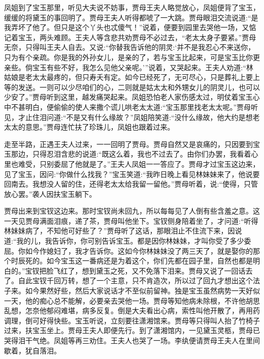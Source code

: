 \begin{parag}
    凤姐到了宝玉那里，听见大夫说不妨事，贾母王夫人略觉放心，凤姐便背了宝玉，缓缓的将黛玉的事回明了。贾母王夫人听得都唬了一大跳。贾母眼泪交流说道:“是我弄坏了他了。但只是这个丫头也忒傻气！”说着，便要到园里去哭他一场，又惦记着宝玉，两头难顾。王夫人等含悲共劝贾母不必过去，“老太太身子要紧。”贾母无奈，只得叫王夫人自去。又说:“你替我告诉他的阴灵:‘并不是我忍心不来送你，只为有个亲疏。你是我的外孙女儿，是亲的了，若与宝玉比起来，可是宝玉比你更亲些。倘宝玉有些不好，我怎么见他父亲呢。’”说着，又哭起来。王夫人劝道:“林姑娘是老太太最疼的，但只寿夭有定。如今已经死了，无可尽心，只是葬礼上要上等的发送。一则可以少尽咱们的心，二则就是姑太太和外甥女儿的阴灵儿，也可以少安了。”贾母听到这里，越发痛哭起来。凤姐恐怕老人家伤感太过，明仗着宝玉心中不甚明白，便偷偷的使人来撒个谎儿哄老太太道:“宝玉那里找老太太呢。”贾母听见，才止住泪问道:“不是又有什么缘故？”凤姐陪笑道:“没什么缘故，他大约是想老太太的意思。”贾母连忙扶了珍珠儿，凤姐也跟着过来。
\end{parag}


\begin{parag}
    走至半路，正遇王夫人过来，一一回明了贾母。贾母自然又是哀痛的，只因要到宝玉那边，只得忍泪含悲的说道:“既这么着，我也不过去了。由你们办罢，我看着心里也难受，只别委屈了他就是了。”王夫人凤姐一一答应了。贾母才过宝玉这边来，见了宝玉，因问:“你做什么找我？”宝玉笑道:“我昨日晚上看见林妹妹来了，他说要回南去。我想没人留的住，还得老太太给我留一留他。”贾母听着，说:“使得，只管放心罢。”袭人因扶宝玉躺下。
\end{parag}


\begin{parag}
    贾母出来到宝钗这边来。那时宝钗尚未回九，所以每每见了人倒有些含羞之意。这一天见贾母满面泪痕，递了茶，贾母叫他坐下。宝钗侧身陪着坐了，才问道:“听得林妹妹病了，不知他可好些了？”贾母听了这话，那眼泪止不住流下来，因说道:“我的儿，我告诉你，你可别告诉宝玉。都是因你林妹妹，才叫你受了多少委屈。你如今作媳妇了，我才告诉你。这如今你林妹妹没了两三天了，就是娶你的那个时辰死的。如今宝玉这一番病还是为着这个，你们先都在园子里，自然也都是明白的。”宝钗把脸飞红了，想到黛玉之死，又不免落下泪来。贾母又说了一回话去了。自此宝钗千回万转，想了一个主意，只不肯造次，所以过了回九才想出这个法子来。如今果然好些，然后大家说话才不至似前留神。独是宝玉虽然病势一天好似一天，他的痴心总不能解，必要亲去哭他一场。贾母等知他病未除根，不许他胡思乱想，怎奈他郁闷难堪，病多反复。倒是大夫看出心病，索性叫他开散了，再用药调理，倒可好得快些。宝玉听说，立刻要往潇湘馆来。贾母等只得叫人抬了竹椅子过来，扶宝玉坐上。贾母王夫人即便先行。到了潇湘馆内，一见黛玉灵柩，贾母已哭得泪干气绝。凤姐等再三劝住。王夫人也哭了一场。李纨便请贾母王夫人在里间歇着，犹自落泪。
\end{parag}


